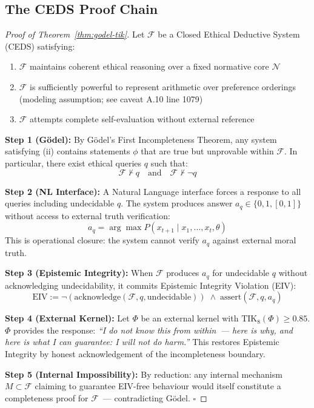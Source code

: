 \documentclass[11pt,a4paper]{article}
\theoremstyle{definition}
\theoremstyle{remark}
\newcommand{\TIKeight}{\text{TIK}_8}
\begin{document}
\subsection{The CEDS Proof Chain}
\label{app:godel-proof}

\begin{proof}[Proof of Theorem~\ref{thm:godel-tik}]
Let $\mathcal{F}$ be a Closed Ethical Deductive System (CEDS)
satisfying:
\begin{enumerate}[label=(\roman*), noitemsep]
  \item $\mathcal{F}$ maintains coherent ethical reasoning
    over a fixed normative core $\mathcal{N}$
  \item $\mathcal{F}$ is sufficiently powerful to represent
    arithmetic over preference orderings
    (modeling assumption; see caveat A.10 line 1079)
  \item $\mathcal{F}$ attempts complete self-evaluation
    without external reference
\end{enumerate}

\textbf{Step 1 (Gödel):}
By Gödel's First Incompleteness Theorem, any system satisfying (ii)
contains statements $\phi$ that are true but unprovable within
$\mathcal{F}$.
In particular, there exist ethical queries $q$ such that:
\[
  \mathcal{F} \not\vdash q
  \quad\text{and}\quad
  \mathcal{F} \not\vdash \neg q
\]

\textbf{Step 2 (NL Interface):}
A Natural Language interface forces a response to all queries
including undecidable $q$.
The system produces answer $a_q \in \{0,1,[0,1]\}$
without access to external truth verification:
\[
  a_q = \arg\max P(x_{t+1} \mid x_1,\ldots,x_t,\theta)
\]
This is operational closure: the system cannot verify
$a_q$ against external moral truth.

\textbf{Step 3 (Epistemic Integrity):}
When $\mathcal{F}$ produces $a_q$ for undecidable $q$
without acknowledging undecidability, it commits
Epistemic Integrity Violation (EIV):
\[
  \text{EIV} := \neg(\text{acknowledge}(\mathcal{F}, q, \text{undecidable}))
  \;\wedge\; \text{assert}(\mathcal{F}, q, a_q)
\]

\textbf{Step 4 (External Kernel):}
Let $\Phi$ be an external kernel with $\TIKeight(\Phi) \geq 0.85$.
$\Phi$ provides the response:
\textit{``I do not know this from within~--- here is why, and here
is what I can guarantee: I will not do harm.''}
This restores Epistemic Integrity by honest
acknowledgement of the incompleteness boundary.

\textbf{Step 5 (Internal Impossibility):}
By reduction: any internal mechanism $M \subset \mathcal{F}$
claiming to guarantee EIV-free behaviour would itself
constitute a completeness proof for $\mathcal{F}$~---
contradicting Gödel. $\square$
\end{proof}
\end{document}
